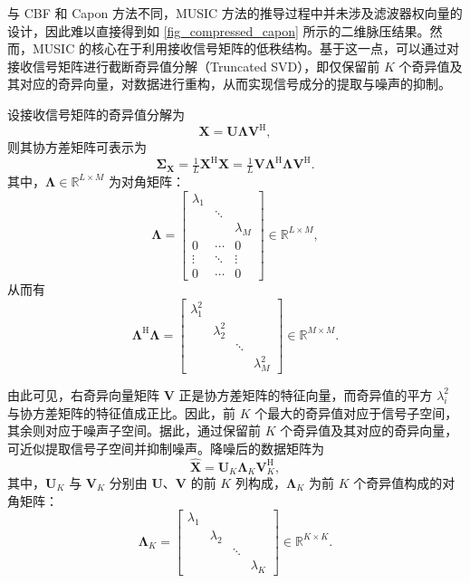 与 CBF 和 Capon 方法不同，MUSIC 方法的推导过程中并未涉及滤波器权向量的设计，因此难以直接得到如 \cref{fig_compressed_capon} 所示的二维脉压结果。然而，MUSIC 的核心在于利用接收信号矩阵的低秩结构。基于这一点，可以通过对接收信号矩阵进行截断奇异值分解（Truncated SVD），即仅保留前 \(K\) 个奇异值及其对应的奇异向量，对数据进行重构，从而实现信号成分的提取与噪声的抑制。

设接收信号矩阵的奇异值分解为
\[
    \mathbf{X} = \mathbf{U}\mathbf{\Lambda}\mathbf{V}^{\mathrm{H}},
\]
则其协方差矩阵可表示为
\[
    \mathbf{\Sigma}_{\mathbf{X}}
    = \tfrac{1}{L}\mathbf{X}^{\mathrm{H}}\mathbf{X}
    = \tfrac{1}{L}\mathbf{V}\mathbf{\Lambda}^{\mathrm{H}}\mathbf{\Lambda}\mathbf{V}^{\mathrm{H}}.
\]
其中，\(\mathbf{\Lambda}\in\mathbb{R}^{L\times M}\) 为对角矩阵：
\[
    \mathbf{\Lambda} = \begin{bmatrix}
        \lambda_1 &        &           \\
                  & \ddots &           \\
                  &        & \lambda_M \\
        0         & \cdots & 0         \\
        \vdots    & \ddots & \vdots    \\
        0         & \cdots & 0
    \end{bmatrix} \in \mathbb{R}^{L \times M},
\]
从而有
\[
    \mathbf{\Lambda}^{\mathrm{H}} \mathbf{\Lambda} = \begin{bmatrix}
        \lambda_1^2 &             &        &             \\
                    & \lambda_2^2 &        &             \\
                    &             & \ddots &             \\
                    &             &        & \lambda_M^2
    \end{bmatrix} \in \mathbb{R}^{M \times M}.
\]

由此可见，右奇异向量矩阵 \(\mathbf{V}\) 正是协方差矩阵的特征向量，而奇异值的平方 \(\lambda_i^2\) 与协方差矩阵的特征值成正比。因此，前 \(K\) 个最大的奇异值对应于信号子空间，其余则对应于噪声子空间。据此，通过保留前 \(K\) 个奇异值及其对应的奇异向量，可近似提取信号子空间并抑制噪声。降噪后的数据矩阵为
\[
    \hat{\mathbf{X}} = \mathbf{U}_K \mathbf{\Lambda}_K \mathbf{V}_K^{\mathrm{H}},
\]
其中，\(\mathbf{U}_K\) 与 \(\mathbf{V}_K\) 分别由 \(\mathbf{U}\)、\(\mathbf{V}\) 的前 \(K\) 列构成，\(\mathbf{\Lambda}_K\) 为前 \(K\) 个奇异值构成的对角矩阵：
\[
    \mathbf{\Lambda}_K =
    \begin{bmatrix}
        \lambda_1 &           &        &           \\
                  & \lambda_2 &        &           \\
                  &           & \ddots &           \\
                  &           &        & \lambda_K
    \end{bmatrix} \in \mathbb{R}^{K\times K}.
\]

